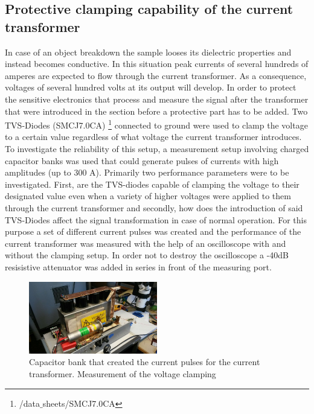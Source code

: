\subsection{Protective clamping capability of the current transformer}
\label{clamping}

In case of an object breakdown the sample looses its dielectric properties and instead becomes conductive.
In this situation peak currents of several hundreds of amperes are expected to flow through the current transformer.
As a consequence, voltages of several hundred volts at its output will develop. In order to protect the sensitive electronics that
process and measure the signal after the transformer that were introduced in the section before a protective part has to be added.
Two TVS-Diodes (SMCJ7.0CA) \footnote{/data$\_$sheets/SMCJ7.0CA} connected to ground were used to clamp the voltage to a certain value regardless of what voltage the current transformer introduces.
To investigate the reliability of this setup, a measurement setup involving charged capacitor banks was used that could generate
pulses of currents with high amplitudes (up to 300 A). 
Primarily two performance parameters were to be investigated. First, are the TVS-diodes capable of clamping the voltage to their designated value even when
a variety of higher voltages were applied to them through the current transformer and secondly, how does the introduction of said TVS-Diodes affect the
signal transformation in case of normal operation. 
\newline
For this purpose a set of different current pulses was created and the performance of the current transformer was measured with the help of an
oscilloscope with and without the clamping setup. In order not to destroy the oscilloscope a -40dB resisistive attenuator was added in series in front of
the measuring port.

\begin{figure}[h!tb]
\centerline{\includegraphics[width=0.5\textwidth]{figures/Method/Clamp/capacitorbank.jpg}}
    \caption{Capacitor bank that created the current pulses for the current transformer. Measurement of the voltage clamping}
    \label{fig.clamp}
\end{figure}




